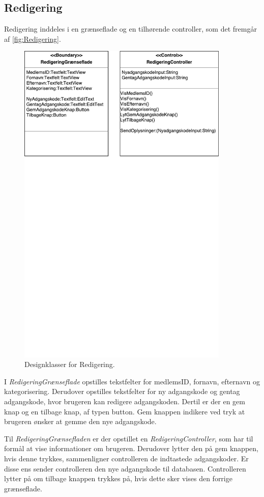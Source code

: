 \subsection{Redigering}
Redigering inddeles i en grænseflade og en tilhørende controller, som det fremgår af \autoref{fig:Redigering}. 

\begin{figure} [H]
\centering
\includegraphics[width=0.9\textwidth]{figures/MVC/Redigering}
\caption{Designklasser for Redigering.}
\label{fig:Redigering}
\end{figure}


\noindent
I \textit{RedigeringGrænseflade} opstilles tekstfelter for medlemsID, fornavn, efternavn og kategorisering. Derudover opstilles tekstfelter for ny adgangskode og gentag adgangskode, hvor brugeren kan redigere adgangskoden. Dertil er der en gem knap og en tilbage knap, af typen button. Gem knappen indikere ved tryk at brugeren ønsker at gemme den nye adgangskode. 


Til \textit{RedigeringGrænsefladen} er der opstillet en \textit{RedigeringController}, som har til formål at vise informationer om brugeren. Derudover lytter den på gem knappen, hvis denne trykkes, sammenligner controlleren de indtastede adgangskoder. Er disse ens sender controlleren den  nye adgangskode til databasen. Controlleren lytter på om tilbage knappen trykkes på, hvis dette sker vises den forrige grænseflade.  

